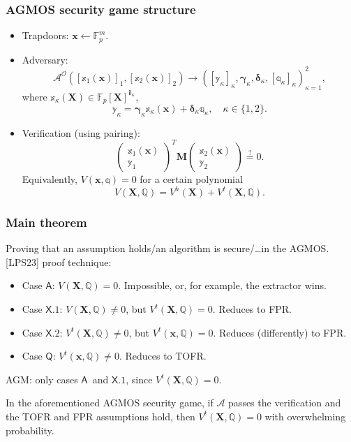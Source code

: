 \documentclass[9pt]{beamer}
\newcommand{\F}{\mathbb{F}}
\newcommand{\A}{\mathcal A}  %
\newcommand{\Oracle}{\mathcal{O}}  %
\newcommand{\il}{\mathsf{il}}  %
\newcommand{\caseA}{\ensuremath{\mathsf{A}}}
\newcommand{\caseQ}{\ensuremath{\mathsf{Q}}}
\newcommand{\caseXone}{\ensuremath{\mathsf{X.1}}}
\newcommand{\caseXtwo}{\ensuremath{\mathsf{X.2}}}
\begin{document}
\begin{frame}
\frametitle{AGMOS security game structure}
\begin{itemize}
    \item Trapdoors: $ \bm x \gets \F_p^m $.
    \item Adversary:
    \[
    \A^\Oracle([\mathbb x_1(\bm x)]_1, [\mathbb x_2(\bm x)]_2) \to
    ([\mathbb y_\kappa]_\kappa, \bm \gamma_\kappa, \bm \delta_\kappa, [\mathbb q_\kappa]_\kappa)_{\kappa=1}^2,
    \]
    where $ \mathbb x_\kappa(\bm X) \in \F_p[\bm X]^{\il_\kappa} $, 
    \[
    \mathbb y_\kappa = \bm{\gamma}_\kappa \mathbb x_\kappa(\bm x) + \bm \delta_\kappa \mathbb q_\kappa, \quad 
    \kappa \in \{ 1, 2 \}.
    \]
    \item Verification (using pairing):
    \[
        \begin{pmatrix}
           \mathbb x_1(\bm x) \\
           \mathbb y_1
        \end{pmatrix}^T
        \bm M
        \begin{pmatrix}
           \mathbb x_2(\bm x) \\
           \mathbb y_2
        \end{pmatrix} \overset{?}{=} 0.
    \]
    Equivalently, $ V(\bm x, \mathbb q) = 0 $ for a certain polynomial
    \[
    V(\bm X, \mathbb Q) = V^h(\bm X) + V^t(\bm X, \mathbb Q).
    \]
\end{itemize}
\end{frame}


\begin{frame}
\frametitle{Main theorem}
Proving that an assumption holds/an algorithm is secure/\dots in the AGMOS. [LPS23] proof technique:
\begin{itemize}
    \item Case \caseA: $ V(\bm X, \mathbb Q) = 0 $. Impossible, or, for example, the extractor wins.
    \item Case \caseXone: $ V(\bm X, \mathbb Q) \neq 0 $, but $ V^t(\bm X, \mathbb Q) = 0 $. Reduces to FPR.
    \item Case \caseXtwo: $ V^t(\bm X, \mathbb Q) \neq 0 $, but $ V^t(\bm x, \mathbb Q) = 0 $. Reduces (differently) to FPR.
    \item Case \caseQ: $ V^t(\bm x, \mathbb Q) \neq 0 $. Reduces to TOFR.
\end{itemize}
AGM: only cases \caseA \ and \caseXone, since $ V^t(\bm X, \mathbb Q) = 0 $.
\begin{theorem}[informal]
    In the aforementioned AGMOS security game, if $ \A $ passes the verification and the TOFR and FPR assumptions hold, then $ V^t(\bm X, \mathbb Q) = 0 $ with overwhelming probability.
\end{theorem}
\end{frame}
\end{document}
